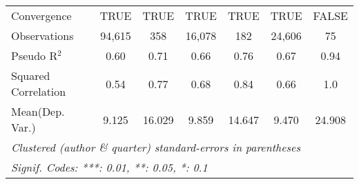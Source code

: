 \begin{tabular}{lcccccc}
   Convergence                                                &TRUE          & TRUE         & TRUE          & TRUE   & TRUE    & FALSE\\  
   Observations                                               & 94,615       & 358          & 16,078        & 182    & 24,606  & 75\\  
   Pseudo R$^2$                                               & 0.60         & 0.71         & 0.66          & 0.76   & 0.67    & 0.94\\  
   Squared Correlation                                        & 0.54         & 0.77         & 0.68          & 0.84   & 0.66    & 1.0\\  
Mean(Dep. Var.) & 9.125 & 16.029 & 9.859 & 14.647 & 9.470 & 24.908 \\
   \midrule \midrule
   \multicolumn{7}{l}{\emph{Clustered (author \& quarter) standard-errors in parentheses}}\\
   \multicolumn{7}{l}{\emph{Signif. Codes: ***: 0.01, **: 0.05, *: 0.1}}\\
\end{tabular}
\par\endgroup
